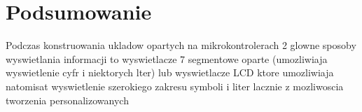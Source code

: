 \documentclass{article}
\begin{document}
\section{Podsumowanie}

 Podczas konstruowania ukladow opartych na  mikrokontrolerach 2 glowne sposoby wyswietlania informacji
 to wyswietlacze 7 segmentowe oparte (umozliwiaja wyswietlenie cyfr i niektorych lter) lub wyswietlacze LCD ktore umozliwiaja
 natomisat wyswietlenie szerokiego zakresu symboli i liter lacznie z mozliwoscia tworzenia personalizowanych
\end{document}
